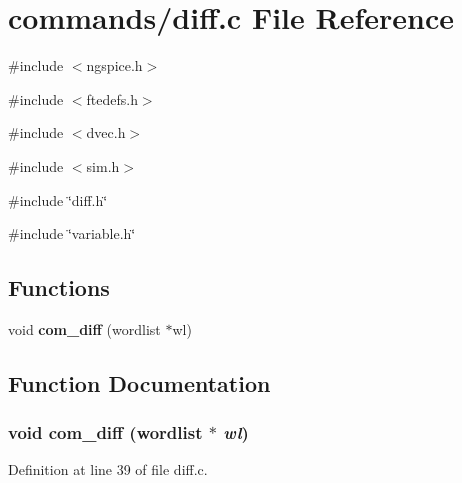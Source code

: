 \section{commands/diff.c File Reference}
\label{diff_8c}
{\ttfamily \#include $<$ngspice.h$>$}\par
{\ttfamily \#include $<$ftedefs.h$>$}\par
{\ttfamily \#include $<$dvec.h$>$}\par
{\ttfamily \#include $<$sim.h$>$}\par
{\ttfamily \#include \char`\"{}diff.h\char`\"{}}\par
{\ttfamily \#include \char`\"{}variable.h\char`\"{}}\par
\subsection*{Functions}
\begin{DoxyCompactItemize}
\item 
void {\bf com\_\-diff} (wordlist $\ast$wl)
\end{DoxyCompactItemize}


\subsection{Function Documentation}
\subsubsection[{com\_\-diff}]{\setlength{\rightskip}{0pt plus 5cm}void com\_\-diff (wordlist $\ast$ {\em wl})}\label{diff_8c_a68d2fbd01278c5a55f7dd94681a71a85}


Definition at line 39 of file diff.c.


